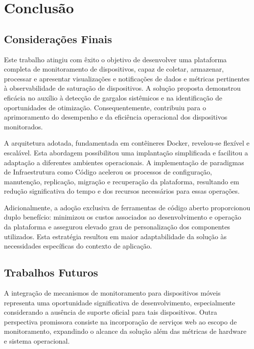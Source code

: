 \chapter{Conclusão}
\label{chap5}

\section{Considerações Finais}
\label{section:ConsideracoesFinais}

Este trabalho atingiu com êxito o objetivo de desenvolver uma plataforma completa de monitoramento de dispositivos, capaz de coletar, armazenar, processar e apresentar visualizações e notificações de dados e métricas pertinentes à observabilidade de saturação de dispositivos. A solução proposta demonstrou eficácia no auxílio à detecção de gargalos sistêmicos e na identificação de oportunidades de otimização. Consequentemente, contribuiu para o aprimoramento do desempenho e da eficiência operacional dos dispositivos monitorados.

A arquitetura adotada, fundamentada em contêineres Docker, revelou-se flexível e escalável. Esta abordagem possibilitou uma implantação simplificada e facilitou a adaptação a diferentes ambientes operacionais. A implementação de paradigmas de Infraestrutura como Código acelerou os processos de configuração, manutenção, replicação, migração e recuperação da plataforma, resultando em redução significativa do tempo e dos recursos necessários para essas operações.

Adicionalmente, a adoção exclusiva de ferramentas de código aberto proporcionou duplo benefício: minimizou os custos associados ao desenvolvimento e operação da plataforma e assegurou elevado grau de personalização dos componentes utilizados. Esta estratégia resultou em maior adaptabilidade da solução às necessidades específicas do contexto de aplicação.

\section{Trabalhos Futuros}
\label{section:TrabalhosFuturos}

A integração de mecanismos de monitoramento para dispositivos móveis representa uma oportunidade significativa de desenvolvimento, especialmente considerando a ausência de suporte oficial para tais dispositivos. Outra perspectiva promissora consiste na incorporação de serviços web ao escopo de monitoramento, expandindo o alcance da solução além das métricas de hardware e sistema operacional.

